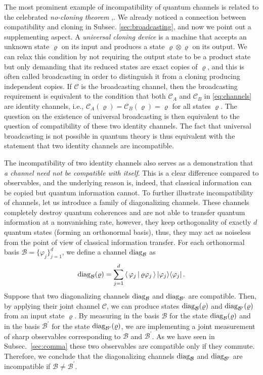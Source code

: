 \documentclass[12pt]{article}
\theoremstyle{definition}
\newcommand{\ip}[2]{\left\langle\,#1\,|\,#2\,\right\rangle} %
\newcommand{\kb}[2]{|#1\rangle\langle#2|} %
\newcommand{\Cc}{\mathcal{C}} %
\begin{document}
{The most prominent example of incompatibility of quantum channels is related to the celebrated \emph{no-cloning theorem}  \cite{Dieks82},\cite{WoZu82}. 
We already noticed a connection between compatibility and cloning in Subsec. \ref{sec:broadcasting}, and now we point out a supplementing aspect. A \emph{universal cloning device} \cite{BuHi96} is a machine that accepts an unknown state $\varrho$ on its input and produces a state $\varrho\otimes\varrho$ on its output. We can relax this condition by not requiring the output state to be a product state but only demanding that its reduced states are exact copies of $\varrho$, and this is often called broadcasting in order to distinguish it from a cloning producing independent copies. 
If $\Cc$ is the broadcasting channel, then the broadcasting requirement is equivalent to the condition that both $\Cc_A$ and $\Cc_B$ in \eqref{eq:channels} are identity channels, i.e., $\Cc_A(\varrho)=\Cc_B(\varrho)=\varrho$ for all states $\varrho$. The question on the existence of universal broadcasting is then equivalent to the question of compatibility of these two identity channels. 
The fact that universal broadcasting is not possible in quantum theory is thus equivalent with the statement that two identity channels are incompatible. 

The incompatibility of two identity channels also serves as a demonstration that \emph{a channel need not be compatible with itself}. This is a clear difference compared to observables, and the underlying reason is, indeed, that classical information can be copied but quantum information cannot. 
To further illustrate incompatibility of channels, let us introduce a family of diagonalizing channels. 
These channels completely destroy quantum coherences and are not able to transfer quantum information at a nonvanishing rate, however, they keep orthogonality of exactly $d$ quantum states (forming an orthonormal basis), thus, they may act as noiseless from the point of view of classical information transfer. 
For each orthonormal basis $\mathcal{B}=\{\varphi_j\}_{j=1}^d$, we define a channel ${\rm diag}_{\mathcal{B}}$ as
\begin{equation}
{\rm diag}_{\mathcal{B}}(\varrho)=\sum_{j=1}^d \ip{\varphi_j}{\varrho\varphi_j}
\kb{\varphi_j}{\varphi_j}\, .
\end{equation}
Suppose that two diagonalizing channels ${\rm diag}_{\mathcal{B}}$ 
and ${\rm diag}_{\mathcal{B^\prime}}$ are  compatible. 
Then, by applying their joint channel $\Cc$, we can produce states  ${\rm diag}_{\mathcal{B}}(\varrho)$ and ${\rm diag}_{\mathcal{B^\prime}}(\varrho)$ from an input state $\varrho$.
By measuring in the basis $\mathcal{B}$ for the state ${\rm diag}_{\mathcal{B}}(\varrho)$ and in the basis $\mathcal{B^\prime}$ for the state ${\rm diag}_{\mathcal{B^\prime}}(\varrho)$, we are implementing a joint measurement of sharp observables corresponding to $\mathcal{B}$ and $\mathcal{B^\prime}$.
As we have seen in Subsec.~\ref{sec:comma} these two observables are compatible only if they commute. 
Therefore, we conclude that the diagonalizing channels ${\rm diag}_{\mathcal{B}}$ and ${\rm diag}_{\mathcal{B^\prime}}$ are  incompatible if $\mathcal{B} \neq \mathcal{B^\prime}$.

}
\end{document}
